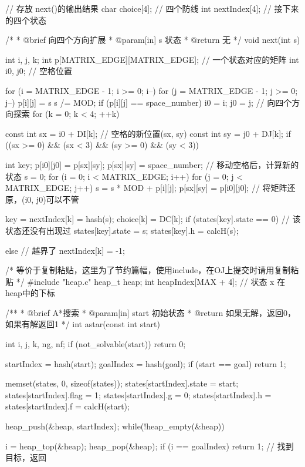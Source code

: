 \begin{Codex}[label=eight_digits_astar.c]
// 存放 next()的输出结果
char choice[4]; // 四个防线
int nextIndex[4]; // 接下来的四个状态

/*
 * @brief 向四个方向扩展
 * @param[in] s 状态
 * @return 无
 */
void next(int s) {
    int i, j, k;
    int p[MATRIX_EDGE][MATRIX_EDGE]; // 一个状态对应的矩阵
    int i0, j0;  // 空格位置

    for (i = MATRIX_EDGE - 1; i >= 0; i--) {
        for (j = MATRIX_EDGE - 1; j >= 0; j--) {
            p[i][j] = s %
            s /= MOD;
            if (p[i][j] == space_number) {
                i0 = i;
                j0 = j;
            }
        }
    }
    // 向四个方向探索
    for (k = 0; k < 4; ++k) {
        const int sx = i0 + DI[k]; // 空格的新位置(sx, sy)
        const int sy = j0 + DJ[k];
        if ((sx >= 0) && (sx < 3) && (sy >= 0) && (sy < 3)) {
            int key;
            p[i0][j0] = p[sx][sy];
            p[sx][sy] = space_number;
            // 移动空格后，计算新的状态
            s = 0;
            for (i = 0; i < MATRIX_EDGE; i++)
                for (j = 0; j < MATRIX_EDGE; j++)
                    s = s * MOD + p[i][j];
            p[sx][sy] = p[i0][j0]; // 将矩阵还原，(i0, j0)可以不管
            
            key = nextIndex[k] = hash(s);
            choice[k] = DC[k];
            if (states[key].state == 0) { // 该状态还没有出现过
                states[key].state = s;
                states[key].h = calcH(s);
            }
        } else {// 越界了
            nextIndex[k] = -1;
        }
    }
}

/* 等价于复制粘贴，这里为了节约篇幅，使用include，在OJ上提交时请用复制粘贴 */
#include "heap.c"
heap_t heap;
int heapIndex[MAX + 4]; // 状态 x 在heap中的下标

/**
 * @brief A*搜索
 * @param[in] start 初始状态
 * @return 如果无解，返回0，如果有解返回1
 */
int astar(const int start) {
    int i, j, k, ng, nf;
    if (not_solvable(start)) return 0;

    startIndex = hash(start);
    goalIndex  = hash(goal);
    if (start == goal) return 1;
    
    memset(states, 0, sizeof(states));
    states[startIndex].state = start;
    states[startIndex].flag    = 1;
    states[startIndex].g       = 0;
    states[startIndex].h       = states[startIndex].f = calcH(start);

    heap_push(&heap, startIndex);
    while(!heap_empty(&heap)) {
        i = heap_top(&heap); heap_pop(&heap);
        if (i == goalIndex) return 1; // 找到目标，返回

}}
\end{Codex}
